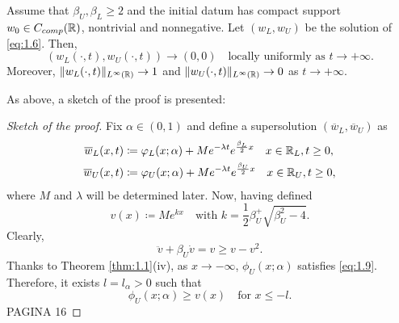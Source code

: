 \begin{theorem}
    Assume that \(\beta_U, \beta_L \geq 2\) and the initial datum has compact support \(w_{0} \in C_{comp}(\mathbb{R})\), nontrivial and nonnegative. Let \((w_L, w_{U})\) be the solution of \eqref{eq:1.6}. Then,
    \[
        (w_L(\cdot, t), w_{U}(\cdot, t)) \to (0, 0) \quad \text{locally uniformly as } t \to +\infty.
    \]
    Moreover, \(\lVert w_L(\cdot, t)\rVert_{L^{\infty}(\mathbb{R})} \to 1\) and \(\lVert w_U(\cdot, t)\rVert_{L^{\infty}(\mathbb{R})} \to 0\) as \(t \to +\infty\).
\end{theorem}
As above, a sketch of the proof is presented:
\begin{proof}[Sketch of the proof]
    Fix \(\alpha \in (0, 1)\) and define a supersolution \((\overline{w}_L, \overline{w}_U)\) as
    \begin{align*}
        \overline{w}_L(x, t) & \coloneqq \varphi_L(x; \alpha) + M e^{-\lambda t} e^{\frac{\beta_L}{2}x} \quad x \in \mathbb{R}_L, t \geq 0, \\
        \overline{w}_U(x, t) & \coloneqq \varphi_U(x; \alpha) + M e^{-\lambda t} e^{\frac{\beta_U}{2}x} \quad x \in \mathbb{R}_U, t \geq 0,
    \end{align*}
    where \(M\) and \(\lambda\) will be determined later. Now, having defined 
    \[
        v(x) \coloneqq M e^{kx} \quad \text{with } k = \frac{1}{2}\beta_U^ + \sqrt{\beta_U^2 - 4}.
    \]
    Clearly,
    \[
        \ddot{v} + \beta_U \dot{v} = v \geq v - v^2.
    \]
    Thanks to Theorem \ref{thm:1.1}(iv), as \(x \to -\infty\), \(\phi_U(x; \alpha)\) satisfies \eqref{eq:1.9}. Therefore, it exists \(l = l_\alpha > 0\) such that
    \[
        \phi_U(x; \alpha) \geq v(x) \quad \text{for } x \leq -l.
    \]
    PAGINA 16
\end{proof}